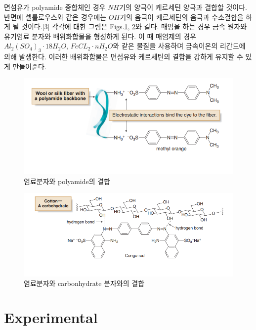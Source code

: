 \documentclass[%
 reprint,
 amsmath,amssymb,
 aps,
]{revtex4-2}
\begin{document}
면섬유가 polyamide 중합체인 경우 $NH$기의 양극이 케르세틴 양극과 결합할 것이다. 반면에 셀룰로우스와 같은 경우에는 $OH$기의 음극이 케르세틴의 음극과 수소결합을 하게 될 것이다.[3] 각각에 대한 그림은 Figs.\ref{fig:NH3_bond}, \ref{fig:OH_bond}와 같다. 매염을 하는 경우 금속 원자와 유기염료 분자와 배위화합물을 형성하게 된다. 이 때 매염제의 경우 $Al_{2}(SO_{4})_{3}\cdot18H_{2}O$, $FeCL_{2}\cdot nH_{2}O$와 같은 물질을 사용하며 금속이온의 리간드에 의해 발생한다. 이러한 배위화합물은 면섬유와 케르세틴의 결합을 강하게 유지할 수 있게 만들어준다.
\begin{figure}[htbp]
	\includegraphics[width = 0.6\linewidth]{NH3_bond.png}%
	\caption{\label{fig:NH3_bond}염료분자와 polyamide의 결합}
\end{figure}
\begin{figure}[htbp]
	\includegraphics[width = 0.6\linewidth]{OH_bond.png}%
	\caption{\label{fig:OH_bond}염료분자와 carbonhydrate 분자와의 결합}
\end{figure}

\section{\label{sec:level1}Experimental}
\end{document}
